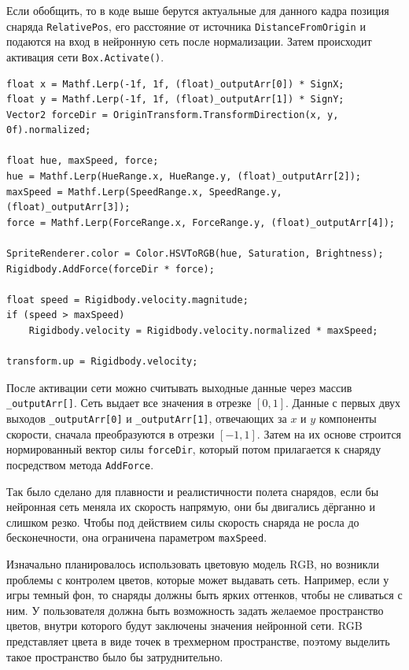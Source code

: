 Если обобщить, то в коде выше берутся актуальные для данного кадра позиция снаряда \lstinline{RelativePos}, его расстояние от источника \lstinline{DistanceFromOrigin} и подаются на вход в нейронную сеть после нормализации. Затем происходит активация сети \lstinline{Box.Activate()}.



\pagebreak

\begin{lstlisting}[name=Projectile, caption={Projectile. Part 2}]
float x = Mathf.Lerp(-1f, 1f, (float)_outputArr[0]) * SignX;
float y = Mathf.Lerp(-1f, 1f, (float)_outputArr[1]) * SignY;    
Vector2 forceDir = OriginTransform.TransformDirection(x, y, 0f).normalized;
    
float hue, maxSpeed, force;
hue = Mathf.Lerp(HueRange.x, HueRange.y, (float)_outputArr[2]);
maxSpeed = Mathf.Lerp(SpeedRange.x, SpeedRange.y, (float)_outputArr[3]);
force = Mathf.Lerp(ForceRange.x, ForceRange.y, (float)_outputArr[4]);

SpriteRenderer.color = Color.HSVToRGB(hue, Saturation, Brightness);
Rigidbody.AddForce(forceDir * force);

float speed = Rigidbody.velocity.magnitude;
if (speed > maxSpeed)
    Rigidbody.velocity = Rigidbody.velocity.normalized * maxSpeed;

transform.up = Rigidbody.velocity;
\end{lstlisting}

После активации сети можно считывать выходные данные через массив \lstinline{_outputArr[]}. Сеть выдает все значения в отрезке $[0,1]$. Данные с первых двух выходов \lstinline{_outputArr[0]} и \lstinline{_outputArr[1]}, отвечающих за $x$ и $y$ компоненты скорости, сначала преобразуются в отрезки $[-1,1]$. Затем на их основе строится нормированный вектор силы \lstinline{forceDir}, который потом прилагается к снаряду посредством метода \lstinline{AddForce}.

Так было сделано для плавности и реалистичности полета снарядов, если бы нейронная сеть меняла их скорость напрямую, они бы двигались дёрганно и слишком резко. Чтобы под действием силы скорость снаряда не росла до бесконечности, она ограничена параметром \lstinline{maxSpeed}.

Изначально планировалось использовать цветовую модель RGB, но возникли проблемы с контролем цветов, которые может выдавать сеть. Например, если у игры темный фон, то снаряды должны быть ярких оттенков, чтобы не сливаться с ним. У пользователя должна быть возможность задать желаемое пространство цветов, внутри которого будут заключены значения нейронной сети. RGB представляет цвета в виде точек в трехмерном пространстве, поэтому выделить такое пространство было бы затруднительно.

